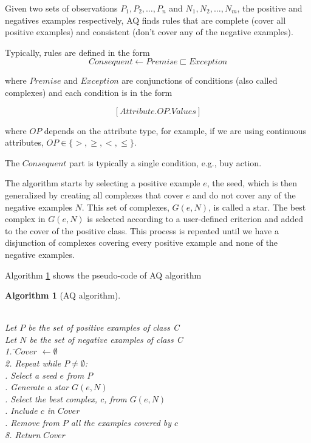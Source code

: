 \documentclass[preprint,3p,twocolumn]{elsarticle}
\newtheorem{algorithm}{Algorithm}[section]
\begin{document}
Given two sets of observations $P_1, P_2, \ldots, P_n$ and $N_1, N_2, \ldots, N_m$, the positive and negatives examples respectively, AQ finds rules that are complete (cover all positive examples) and consistent (don't cover any of the negative examples).

Typically, rules are defined in the form 
$$ Consequent \leftarrow Premise \sqsubset Exception $$ 

where $Premise$ and $Exception$ are conjunctions of conditions (also called complexes) and each condition is in the form

$$ \left[Attribute.OP.Values\right]$$

where $OP$ depends on the attribute type, for example, if we are using continuous attributes, $OP \in \{ >, \geq, <, \leq  \}$.

The $Consequent$ part is typically a single condition, e.g., buy action.

The algorithm starts by selecting a positive example $e$, the seed, which is then generalized by creating all complexes that cover $e$ and do not cover any of the negative examples $N$. This set of complexes, $G(e,N)$, is called a star. The best complex in $G(e,N)$ is selected according to a user-defined criterion and added to the cover of the positive class. This process is repeated until we have a disjunction of complexes covering every positive example and none of the negative examples.

Algorithm \ref{algo:AQ} shows the pseudo-code of AQ algorithm
\begin{algorithm}[AQ algorithm]
\begin{tabbing}
\\Let $P$ be the set of positive examples of class C
\\Let $N$ be the set of negative examples of class C\\
1. \=$Cover$ $\leftarrow \emptyset $ \\
2. Repeat while $P \neq \emptyset$:\\
 . Select a seed $e$ from $P$\\
 . Generate a star $G(e,N)$\\
 . Select the best complex, $c$, from $G(e,N)$\\
 . Include $c$ in $Cover$\\
 . Remove from $P$ all the examples covered by $c$\\
\=8. Return $Cover$
\end{tabbing}
\label{algo:AQ}
\end{algorithm}
\end{document}
